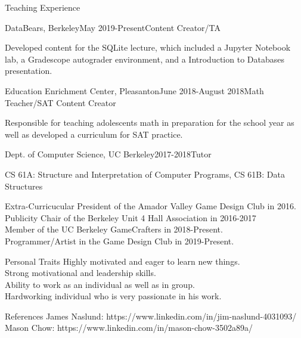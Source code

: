 \documentclass{resume} %
\begin{document}
\begin{rSection}{Teaching Experience} 
\begin{rSubsection}{DataBears, Berkeley}{May 2019-Present}{Content Creator/TA}{}
\item Developed content for the SQLite lecture, which included a Jupyter Notebook lab, a Gradescope autograder environment, and a Introduction to Databases presentation.
\end{rSubsection}

\begin{rSubsection}{Education Enrichment Center, Pleasanton}{June 2018-August 2018}{Math Teacher/SAT Content Creator}{}
\item Responsible for teaching adolescents math in preparation for the school year as well as developed a curriculum for SAT practice.
\end{rSubsection}

\begin{rSubsection}{Dept. of Computer Science, UC Berkeley}{2017-2018}{Tutor}{}
\item CS 61A: Structure and Interpretation of Computer Programs, CS 61B: Data Structures
\end{rSubsection}
\end{rSection}

\newpage

\begin{rSection}{Extra-Curricucular} \itemsep -3pt
President of the Amador Valley Game Design Club in 2016. \\
Publicity Chair of the Berkeley Unit 4 Hall Association in 2016-2017 \\
Member of the UC Berkeley GameCrafters in 2018-Present. \\
Programmer/Artist in the Game Design Club in 2019-Present.
\end{rSection}

\begin{rSection}{Personal Traits}
Highly motivated and eager to learn new things. \\
Strong motivational and leadership skills. \\
Ability to work as an individual as well as in group. \\
Hardworking individual who is very passionate in his work. \\
\end{rSection}

\begin{rSection}{References}
James Naslund: https://www.linkedin.com/in/jim-naslund-4031093/ \\
Mason Chow: https://www.linkedin.com/in/mason-chow-3502a89a/
\end{rSection}
\end{document}
